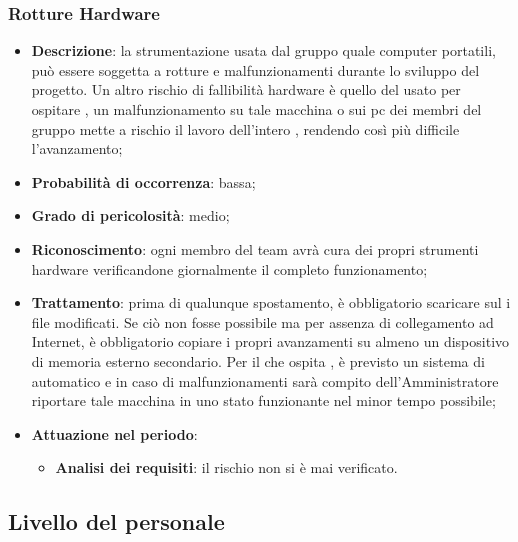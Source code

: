 		\subsubsection{Rotture Hardware}
		\begin{itemize}
			\item \textbf{Descrizione}: la strumentazione usata dal gruppo quale computer portatili, può essere soggetta a rotture e malfunzionamenti durante lo sviluppo del progetto. Un altro rischio di fallibilità hardware è quello del  usato per ospitare 				, un malfunzionamento su tale macchina o sui pc dei membri del gruppo mette a rischio il lavoro dell'intero , rendendo così più difficile l'avanzamento;
			\item \textbf{Probabilità di occorrenza}: bassa;
			\item \textbf{Grado di pericolosità}: medio;
			\item \textbf{Riconoscimento}: ogni membro del team avrà cura dei propri strumenti hardware verificandone giornalmente il completo funzionamento;
			\item \textbf{Trattamento}: prima di qualunque spostamento, è obbligatorio scaricare sul   i file modificati. Se ciò non fosse possibile ma per assenza di collegamento ad Internet, è obbligatorio copiare i propri avanzamenti su almeno un dispositivo di memoria esterno secondario. Per il  che ospita , è previsto un sistema di  automatico e in caso di malfunzionamenti sarà compito dell’Amministratore riportare tale macchina in uno stato funzionante nel minor tempo possibile; 
			\item \textbf{Attuazione nel periodo}:
			\begin{itemize}
				\item \textbf{Analisi dei requisiti}: il rischio non si è mai verificato.
			\end{itemize}
		\end{itemize}
	\subsection{Livello del personale}
